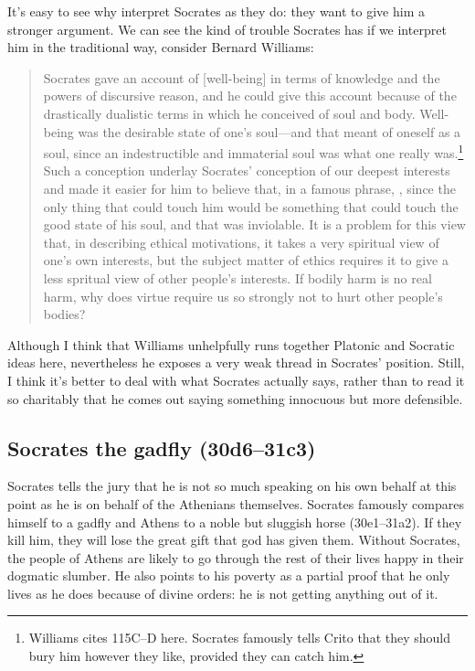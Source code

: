 \documentclass[11pt]{article}
\begin{document}
It's easy to see why \citeauthor{brickhouse2004} interpret Socrates as they
do: they want to give him a stronger argument.  We can see the kind of
trouble Socrates has if we interpret him in the traditional way, consider
Bernard Williams:

\begin{quote}
    Socrates gave an account of [well-being] in terms of knowledge and the
    powers of discursive reason, and he could give this account because of
    the drastically dualistic terms in which he conceived of soul and body.
    Well-being was the desirable state of one's soul---and that meant of
    oneself as a soul, since an indestructible and immaterial soul was what
    one really was.\footnote{Williams cites  115C--D here.
    Socrates famously tells Crito that they should bury him however
    they like, provided they can catch him.}  Such a conception
    underlay Socrates' conception of our deepest interests and made it
    easier for him to believe that, in a famous phrase, , since the only thing that could touch
    him would be something that could touch the good state of his soul,
    and that was inviolable.  It is a problem for this view that, in
    describing ethical motivations, it takes a very spiritual view of
    one's own interests, but the subject matter of ethics requires it
    to give a less spritual view of other people's interests. If bodily
    harm is no real harm, why does virtue require us so strongly not to
    hurt other people's bodies?  \citep[34]{williams1985}
\end{quote}

Although I think that Williams unhelpfully runs together Platonic and
Socratic ideas here, nevertheless he exposes a very weak thread in
Socrates' position.  Still, I think it's better to deal with what Socrates
actually says, rather than to read it so charitably that he comes out
saying something innocuous but more defensible.


\subsection{Socrates the gadfly (30d6--31c3)}

Socrates tells the jury that he is not so much speaking on his own behalf
at this point as he is on behalf of the Athenians themselves.  Socrates
famously compares himself to a gadfly and Athens to a noble but sluggish
horse (30e1--31a2).  If they kill him, they will lose the great gift that
god has given them.  Without Socrates, the people of Athens are likely to
go through the rest of their lives happy in their dogmatic slumber.  He
also points to his poverty as a partial proof that he only lives as he does
because of divine orders: he is not getting anything out of it.
\end{document}
